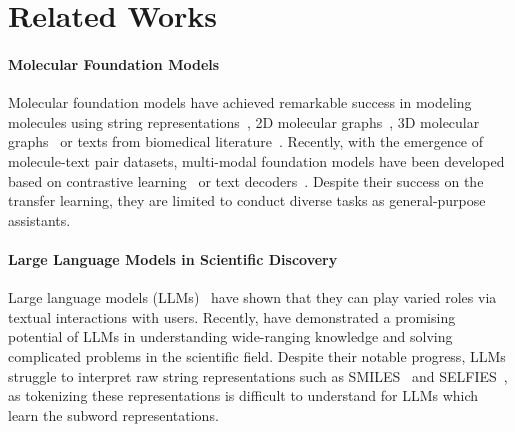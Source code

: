 \section{Related Works}
\vspace{-0.05in}
\paragraph{Molecular Foundation Models}
Molecular foundation models have achieved remarkable success in modeling molecules using string representations~\cite{chithrananda2020chemberta,fabian2020molbert,wang2019smilesbert,irwin2022chemformer}, 2D molecular graphs~\cite{ying2021graphormer,mendez2024mole}, 3D molecular graphs~\cite{zhou2023unimol,lu2024unimol+} or texts from biomedical literature~\cite{gu2021domain,lee2020biobert,beltagy2019scibert}. Recently, with the emergence of molecule-text pair datasets, multi-modal foundation models have been developed based on contrastive learning~\cite{su2022momu,liu2023moleculestm} or text decoders~\cite{edwards-etal-2022-molt5,zeng2022kvplm,luo2023molfm,christofidellis2023text+chemt5,liu2024gitmol}. Despite their success on the transfer learning, they are limited to conduct diverse tasks as general-purpose assistants.

\vspace{-0.05in}
\paragraph{Large Language Models in Scientific Discovery}
Large language models (LLMs)~\cite{openai2024gpt4,openai2024gpt4ocard,touvron2023llama2,grattafiori2024llama3} have shown that they can play varied roles via textual interactions with users. Recently, \citet{ai4science2023impactlargelanguagemodels} have demonstrated a promising potential of LLMs in understanding wide-ranging knowledge and solving complicated problems in the scientific field. Despite their notable progress, LLMs struggle to interpret raw string representations such as SMILES~\cite{weininger1988smiles} and SELFIES~\cite{krenn2020selfies}, as tokenizing these representations is difficult to understand for LLMs which learn the subword representations.

\vspace{-0.05in}
